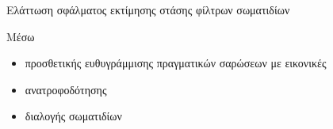 \begin{frame}{Ελάττωση σφάλματος εκτίμησης στάσης φίλτρων σωματιδίων}

  Μέσω
  \begin{itemize}
    \item προσθετικής ευθυγράμμισης πραγματικών σαρώσεων με εικονικές
    \item ανατροφοδότησης
    \item διαλογής σωματιδίων
  \end{itemize}

\end{frame}
